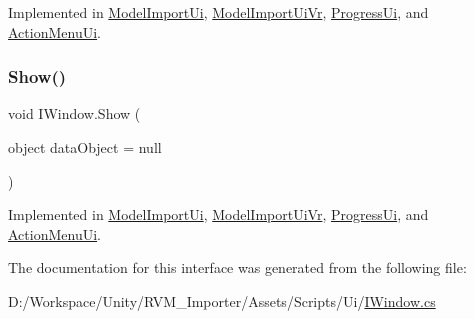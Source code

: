 Implemented in \mbox{\hyperlink{class_model_import_ui_ad4cdb69e11afb1cc7cd6ec723bfde8a0}{Model\+Import\+Ui}}, \mbox{\hyperlink{class_model_import_ui_vr_a20b68a74daa479ca9582518531871b77}{Model\+Import\+Ui\+Vr}}, \mbox{\hyperlink{class_progress_ui_ac3ee49ce28ddca827f90fe13d434c9f4}{Progress\+Ui}}, and \mbox{\hyperlink{class_action_menu_ui_a205cb239d9c7677519de0bab93018659}{Action\+Menu\+Ui}}.

\mbox{\label{interface_i_window_aba12a3c53948d87aef07aed93b225aa9}} 
\subsubsection{\texorpdfstring{Show()}{Show()}}
{\footnotesize\ttfamily void I\+Window.\+Show (\begin{DoxyParamCaption}\item[{object}]{data\+Object = {\ttfamily null} }\end{DoxyParamCaption})}



Implemented in \mbox{\hyperlink{class_model_import_ui_a8f2d7bf13a1f5ad893e24106a56df774}{Model\+Import\+Ui}}, \mbox{\hyperlink{class_model_import_ui_vr_ac34967a5831f33b6afe216322e2909bb}{Model\+Import\+Ui\+Vr}}, \mbox{\hyperlink{class_progress_ui_a59904d8df7c6b696637d26648a26a0b3}{Progress\+Ui}}, and \mbox{\hyperlink{class_action_menu_ui_a8eb85d66f1eb4b4531400dfca9a3b19a}{Action\+Menu\+Ui}}.



The documentation for this interface was generated from the following file\+:\begin{DoxyCompactItemize}
\item 
D\+:/\+Workspace/\+Unity/\+R\+V\+M\+\_\+\+Importer/\+Assets/\+Scripts/\+Ui/\mbox{\hyperlink{_i_window_8cs}{I\+Window.\+cs}}\end{DoxyCompactItemize}
